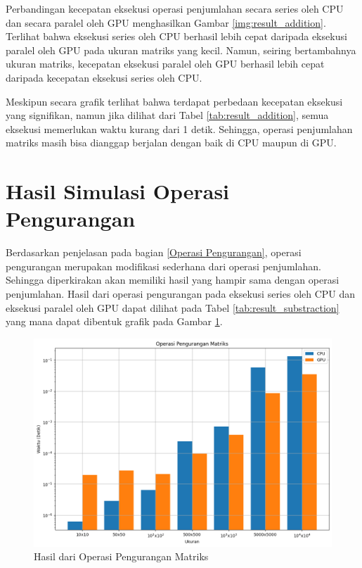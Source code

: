 Perbandingan kecepatan eksekusi operasi penjumlahan secara series oleh CPU dan secara paralel oleh GPU menghasilkan Gambar \ref{img:result_addition}. Terlihat bahwa eksekusi series oleh CPU berhasil lebih cepat daripada eksekusi paralel oleh GPU pada ukuran matriks yang kecil. Namun, seiring bertambahnya ukuran matriks, kecepatan eksekusi paralel oleh GPU berhasil lebih cepat daripada kecepatan eksekusi series oleh CPU.

Meskipun secara grafik terlihat bahwa terdapat perbedaan kecepatan eksekusi yang signifikan, namun jika dilihat dari Tabel \ref{tab:result_addition}, semua eksekusi memerlukan waktu kurang dari 1 detik. Sehingga, operasi penjumlahan matriks masih bisa dianggap berjalan dengan baik di CPU maupun di GPU.

\section{Hasil Simulasi Operasi Pengurangan}

Berdasarkan penjelasan pada bagian \ref{Operasi Pengurangan}, operasi pengurangan merupakan modifikasi sederhana dari operasi penjumlahan. Sehingga diperkirakan akan memiliki hasil yang hampir sama dengan operasi penjumlahan. Hasil dari operasi pengurangan pada eksekusi series oleh CPU dan eksekusi paralel oleh GPU dapat dilihat pada Tabel \ref{tab:result_substraction} yang mana dapat dibentuk grafik pada Gambar \ref{img:result_substraction}.

\begin{figure}[H]
	\centering
	\includegraphics[width=14cm, scale=1]{images/penelitian/substraction.png}
	\caption{Hasil dari Operasi Pengurangan Matriks}
	\label{img:result_substraction}
\end{figure}

